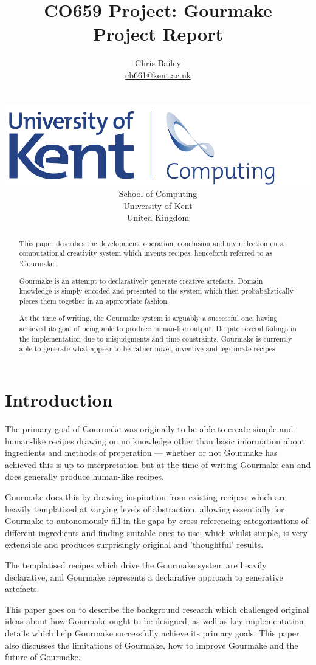 \documentclass[9pt,titlepage,a4paper]{extarticle}
\title{CO659 Project: Gourmake\\ Project Report}
\author{
	\begin{tabular}{ c c c }
		Chris Bailey\\
		\url{cb661@kent.ac.uk}
	\end{tabular}\\
	\\ \vspace{10mm}
		\includegraphics[scale=0.6]{Kent_Comp_294_RGB} \\
		School of Computing \\
		University of Kent \\
		United Kingdom \\ \vspace{10mm}}
\begin{document}
\maketitle

\begin{abstract}
    This paper describes the development, operation, conclusion and my reflection on a computational
    creativity system which invents recipes, henceforth referred to as 'Gourmake'.

    Gourmake is an attempt to declaratively generate creative artefacts. Domain knowledge is simply
    encoded and presented to the system which then probabalistically pieces them together in an 
    appropriate fashion.

    At the time of writing, the Gourmake system is arguably a successful one; having achieved its goal
    of being able to produce human-like output. Despite several failings in the implementation due to misjudgments 
    and time constraints, Gourmake is currently able to generate what appear to be rather novel, 
    inventive and legitimate recipes.
\end{abstract}

\section{Introduction}
    The primary goal of Gourmake was originally to be able to create simple and human-like recipes
    drawing on no knowledge other than basic information about ingredients and
    methods of preperation --- whether or not Gourmake has achieved this is up to interpretation but
    at the time of writing Gourmake can and does generally produce human-like recipes.

    Gourmake does this by drawing inspiration from existing recipes, which are heavily templatised at
    varying levels of abstraction, allowing essentially for Gourmake to autonomously fill in the gaps
    by cross-referencing categorisations of different ingredients and finding suitable ones to use; 
    which whilst simple, is very extensible and produces surprisingly original and 'thoughtful' results.

    The templatised recipes which drive the Gourmake system are heavily declarative, and Gourmake
    represents a declarative approach to generative artefacts.

    This paper goes on to describe the background research which challenged original ideas about how Gourmake
    ought to be designed, as well as key implementation details which help Gourmake successfully achieve
    its primary goals. This paper also discusses the limitations of Gourmake, how to improve Gourmake and
    the future of Gourmake.
\end{document}
